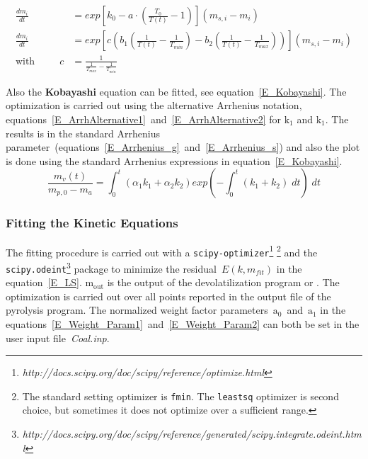 \begin{align}
\label{E_ArrhAlternative1}
 \frac{dm_i}{dt} &= exp \left[ k_0  - a \cdot \left( \frac{T_0}{T(t)}-1 \right)  \right]\left(m_{s,i} - m_i \right)\\
\label{E_ArrhAlternative2}
 \frac{dm_i}{dt} &= exp \left[ c \left(b_1 \left(\frac{1}{T(t)} - \frac{1}{T_{min}}\right) - b_2 \left(\frac{1}{T(t)} - \frac{1}{T_{max}}\right)\right) \right]\left(m_{s,i} - m_i \right)\\
\mathrm{with}\;\;\;\;\;\;\;\;\; c&=\frac{1}{\frac{1}{T_{max}}-\frac{1}{T_{min}}}
\end{align}

Also the \textbf{Kobayashi} equation can be fitted, see equation~\ref{E_Kobayashi}. The optimization is carried out using the alternative Arrhenius notation, equations~\ref{E_ArrhAlternative1}~and~\ref{E_ArrhAlternative2} for $\mathrm{k_1}$ and $\mathrm{k_1}$. The results is in the standard Arrhenius parameter~(equations~\ref{E_Arrhenius_g}~and~\ref{E_Arrhenius_s}) and also the plot is done using the standard Arrhenius expressions in equation~\ref{E_Kobayashi}.
\begin{equation}\label{E_Kobayashi}
 \frac{m_v(t)}{m_{p,0} - m_a}= \int_{0}^{t} ( \alpha_1 k_1 + \alpha_2 k_2 ) exp \left( -  \int_{0}^{t} ( k_1 + k_2 ) \; dt \right) \; dt
\end{equation}


\subsubsection{Fitting the Kinetic Equations}\label{SSS_FitKin}
The fitting procedure is carried out with a \texttt{scipy-optimizer}\footnote{\textit{http://docs.scipy.org/doc/scipy/reference/optimize.html}} \footnote{The standard setting optimizer is \texttt{fmin}.  The \texttt{leastsq} optimizer is second choice, but sometimes it does not optimize over a sufficient range.} and the \texttt{scipy.odeint}\footnote{\textit{http://docs.scipy.org/doc/scipy/reference/generated/scipy.integrate.odeint.html}} package to minimize the residual~$E(k,m_{fit})$ in the equation~\ref{E_LS}. $\mathrm{m_{out}}$ is the output of the devolatilization program \CPD or \FGDVC. The optimization is carried out over all points reported in the output file of the pyrolysis program. The normalized weight factor parameters~$\mathrm{a_0}$~and~$\mathrm{a_1}$ in the equations~\ref{E_Weight_Param1}~and~\ref{E_Weight_Param2} can both be set in the user input file~\emph{Coal.inp}.

